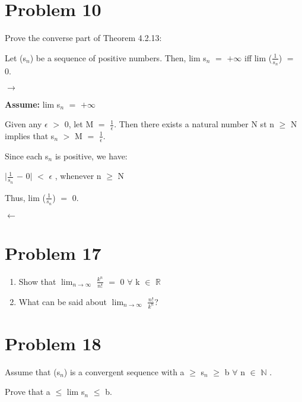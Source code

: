 \documentclass{article}
\newcommand{\mt}[1]{\ensuremath{#1}}
\newcommand\bsc[2][\DefaultOpt]{%
  \def\DefaultOpt{#2}%
  \section[#1]{#2}%
}
\newcommand{\balist}{\begin{enumerate}[label=\alph*.]}
\newcommand{\elist}{\end{enumerate}}
\newcommand{\as}[1]{\textbf{Assume: } #1}
\newcommand{\br}{\mt{\mathbb{R}} }       %
\newcommand{\bn}{\mt{\mathbb{N}} }       %
\newcommand{\ep}{\mt{\epsilon} }         %
\newcommand{\fa}{\mt{\forall} }          %
\newcommand{\mem}{\mt{\in} }
\newcommand{\lra}{ \mt{\longrightarrow} } %
\newcommand{\lla}{ \mt{\longleftarrow} }  %
\newcommand{\av}[1]{\mt{|}#1\mt{|}}  %
\newcommand{\prn}[1]{(#1)}
\newcommand{\ms}{\mt{-} }
\newcommand{\ls}{\mt{<} }
\newcommand{\gr}{\mt{>} }
\newcommand{\lse}{\mt{\leq} }
\newcommand{\gre}{\mt{\geq} }
\newcommand{\eql}{\mt{=} }
\newcommand{\uw}[2]{#1\mt{_{#2}}}
\newcommand{\frc}[2]{\mt{\frac{#1}{#2}}}
\newcommand{\lmti}[1]{\mt{\displaystyle{\lim_{#1 \to \infty}}}}
\begin{document}
\bsc{Problem 10}{
Prove the converse part of Theorem 4.2.13:

Let \prn{\uw{s}{n}} be a sequence of positive numbers. Then, lim \uw{s}{n} \eql $+\infty$ iff lim (\frc{1}{\uw{s}{n}}) \eql 0.

\lra

\as{lim \uw{s}{n} \eql $+\infty$}

Given any \ep \gr 0, let M \eql \frc{1}{\ep}. Then there exists a natural number N st n \gre N implies that \uw{s}{n} \gr M \eql \frc{1}{\ep}.

Since each \uw{s}{n} is positive, we have:

\av{\frc{1}{\uw{s}{n}} \ms 0} \ls \ep, whenever n \gre N

Thus, lim (\frc{1}{\uw{s}{n}}) \eql 0.

\lla 

}

\bsc{Problem 17}{
\balist
\item Show that \lmti{n} \frc{k^n}{n!} \eql 0 \fa k \mem \br
\item What can be said about \lmti{n} \frc{n!}{k^n}?
\elist
}

\bsc{Problem 18}{
Assume that \prn{\uw{s}{n}} is a convergent sequence with a \gre \uw{s}{n} \gre b \fa n \mem \bn.

Prove that a \lse lim \uw{s}{n} \lse b.
}
\end{document}
